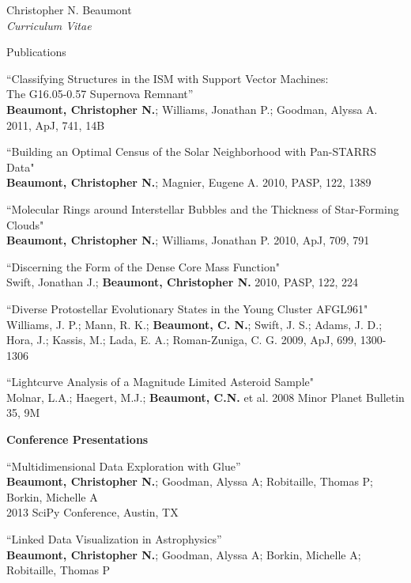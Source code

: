 \documentclass[10pt]{article}
\newenvironment{sublist}{%
	\begin{list}{}{%
		\setlength{\itemsep}{0em}\setlength{\parsep}{0em}%
		\setlength{\topsep}{0em}\setlength{\parskip}{0em}%
	}%
}%
{ \end{list} }
\begin{document}
\begin{cv}{Christopher N. Beaumont\\{\large \itshape Curriculum Vitae}}
\begin{cvlist}{Publications}
\begin{sublist}
	\item ``Classifying Structures in the ISM with Support Vector Machines: \\The G16.05-0.57 Supernova Remnant'' \\
		\textbf{Beaumont, Christopher N.}; Williams, Jonathan P.; Goodman, Alyssa A. 2011, ApJ, 741, 14B\\
	\item ``Building an Optimal Census of the Solar Neighborhood with Pan-STARRS Data" \\
		\textbf{Beaumont, Christopher N.}; Magnier, Eugene A. 2010, PASP, 122, 1389 \\
	\item ``Molecular Rings around Interstellar Bubbles and the Thickness of Star-Forming Clouds" \\
		\textbf{Beaumont, Christopher N.}; Williams, Jonathan P. 2010, ApJ, 709, 791 \\
	\item  ``Discerning the Form of the Dense Core Mass Function" \\
		Swift, Jonathan J.; \textbf{Beaumont, Christopher N.} 2010, PASP, 122, 224 \\
	\item ``Diverse Protostellar Evolutionary States in the Young Cluster AFGL961"  \\
	Williams, J. P.; Mann, R. K.; \textbf{Beaumont, C. N.}; Swift, J. S.; Adams, J. D.; Hora, J.; Kassis, M.; Lada, E. A.; Roman-Zuniga, C. G. 2009, ApJ, 699, 1300-1306\\
	\item ``Lightcurve Analysis of a Magnitude Limited Asteroid Sample" \\
	Molnar, L.A.; Haegert, M.J.; \textbf{Beaumont, C.N.} et al. 2008 Minor Planet Bulletin 35, 9M
	\end{sublist}
	\item \textbf{Conference Presentations}
	\begin{sublist}
	\item ``Multidimensional Data Exploration with Glue''\\
	\textbf{Beaumont, Christopher N.}; Goodman, Alyssa A; Robitaille, Thomas P;  Borkin, Michelle A \\
	2013 SciPy Conference, Austin, TX \\
	\item ``Linked Data Visualization in Astrophysics''\\
	\textbf{Beaumont, Christopher N.}; Goodman, Alyssa A; Borkin, Michelle A; Robitaille, Thomas P \\

\end{sublist}
\end{cvlist}
\end{cv}
\end{document}
